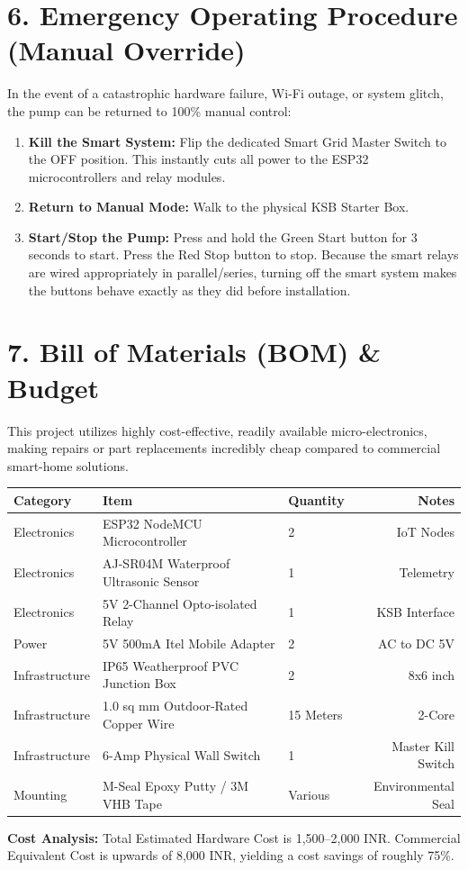\documentclass[11pt, a4paper]{article}
\begin{document}
\section*{6. Emergency Operating Procedure (Manual Override)}
In the event of a catastrophic hardware failure, Wi-Fi outage, or system glitch, the pump can be returned to 100\% manual control:
\begin{enumerate}
    \item \textbf{Kill the Smart System:} Flip the dedicated Smart Grid Master Switch to the OFF position. This instantly cuts all power to the ESP32 microcontrollers and relay modules.
    \item \textbf{Return to Manual Mode:} Walk to the physical KSB Starter Box.
    \item \textbf{Start/Stop the Pump:} Press and hold the Green Start button for 3 seconds to start. Press the Red Stop button to stop. Because the smart relays are wired appropriately in parallel/series, turning off the smart system makes the buttons behave exactly as they did before installation.
\end{enumerate}

\section*{7. Bill of Materials (BOM) \& Budget}
This project utilizes highly cost-effective, readily available micro-electronics, making repairs or part replacements incredibly cheap compared to commercial smart-home solutions.

\vspace{1em}
\begin{tabular}{@{}lllr@{}}
\toprule
\textbf{Category} & \textbf{Item} & \textbf{Quantity} & \textbf{Notes} \\
\midrule
Electronics & ESP32 NodeMCU Microcontroller & 2 & IoT Nodes \\
Electronics & AJ-SR04M Waterproof Ultrasonic Sensor & 1 & Telemetry \\
Electronics & 5V 2-Channel Opto-isolated Relay & 1 & KSB Interface \\
Power & 5V 500mA Itel Mobile Adapter & 2 & AC to DC 5V \\
\addlinespace
Infrastructure & IP65 Weatherproof PVC Junction Box & 2 & 8x6 inch \\
Infrastructure & 1.0 sq mm Outdoor-Rated Copper Wire & 15 Meters & 2-Core \\
Infrastructure & 6-Amp Physical Wall Switch & 1 & Master Kill Switch \\
Mounting & M-Seal Epoxy Putty / 3M VHB Tape & Various & Environmental Seal \\
\bottomrule
\end{tabular}
\vspace{1em}

\textbf{Cost Analysis:} Total Estimated Hardware Cost is 1,500--2,000 INR. Commercial Equivalent Cost is upwards of 8,000 INR, yielding a cost savings of roughly 75\%.
\end{document}
